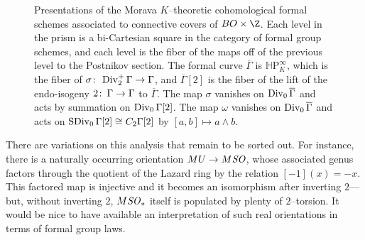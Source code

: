 \begin{figure}
\begin{center}
\end{center}
\caption{Presentations of the Morava \(K\)--theoretic cohomological formal schemes associated to connective covers of \(BO \times \Z\).  Each level in the prism is a bi-Cartesian square in the category of formal group schemes, and each level is the fiber of the maps off of the previous level to the Postnikov section.  The formal curve \(\overline \Gamma\) is \(\mathbb H\mathrm P^\infty_K\), which is the fiber of \(\sigma\colon\thinspace \operatorname{Div}_2^+ \Gamma \to \Gamma\), and \(\overline \Gamma[2]\) is the fiber of the lift of the endo-isogeny \(2\colon\thinspace \Gamma \to \Gamma\) to \(\overline \Gamma\).  The map \(\sigma\) vanishes on \(\operatorname{Div}_0 \overline \Gamma\) and acts by summation on \(\operatorname{Div}_0 \Gamma[2]\).  The map \(\omega\) vanishes on \(\operatorname{Div}_0 \overline \Gamma\) and acts on \(\operatorname{SDiv}_0 \Gamma[2] \cong C_2 \Gamma[2]\) by \([a, b] \mapsto a \wedge b\).}\label{MoravaKthyOfBO}
\end{figure}

\begin{remark}
There are variations on this analysis that remain to be sorted out.  For instance, there is a naturally occurring orientation \(MU \to M\mathit{SO}\), whose associated genus factors through the quotient of the Lazard ring by the relation \([-1](x) = -x\).  This factored map is injective and it becomes an isomorphism after inverting \(2\)---but, without inverting \(2\), \(M\mathit{SO}_*\) itself is populated by plenty of \(2\)--torsion.  It would be nice to have available an interpretation of such real orientations in terms of formal group laws.
\end{remark}

